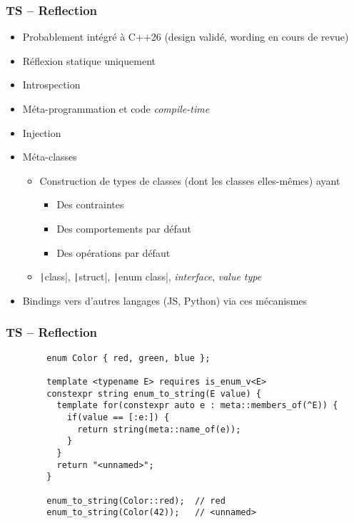 \documentclass[C++.tex]{subfiles}
\begin{document}
\begin{frame}[fragile]
	\frametitle{TS -- Reflection}
	\begin{itemize}
		\item Probablement intégré à C++26 (design validé, wording en cours de revue)
		\item Réflexion statique uniquement
		\item Introspection
		\item Méta-programmation et code \textit{compile-time}
		\item Injection
		\item Méta-classes
		\begin{itemize}
			\item Construction de types de classes (dont les classes elles-mêmes) ayant
			\begin{itemize}
				\item Des contraintes
				\item Des comportements par défaut
				\item Des opérations par défaut
			\end{itemize}
			\item \texttt|class|, \texttt|struct|, \texttt|enum class|, \textit{interface}, \textit{value type}
		\end{itemize}
		\item Bindings vers d'autres langages (JS, Python) via ces mécanismes
	\end{itemize}

\end{frame}

\begin{frame}[fragile]
	\frametitle{TS -- Reflection}
	\begin{verbatim}
		enum Color { red, green, blue };

		template <typename E> requires is_enum_v<E>
		constexpr string enum_to_string(E value) {
		  template for(constexpr auto e : meta::members_of(^E)) {
		    if(value == [:e:]) {
		      return string(meta::name_of(e));
		    }
		  }
		  return "<unnamed>";
		}

		enum_to_string(Color::red);  // red
		enum_to_string(Color(42));   // <unnamed>
	\end{verbatim}

\end{frame}
\end{document}
